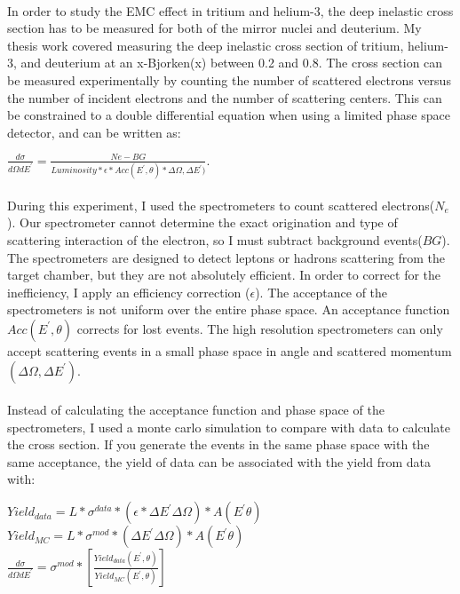 \documentclass[12pt,letterpaper]{article}
\begin{document}
\paragraph{} In order to study the EMC effect in tritium and helium-3, the deep inelastic cross section has to be measured for both of the mirror nuclei and deuterium. My thesis work covered measuring the deep inelastic cross section of tritium, helium-3, and deuterium at an x-Bjorken(x) between 0.2 and 0.8. The cross section can be measured experimentally by counting the number of scattered electrons versus the number of incident electrons and the number of scattering centers. This can be constrained to a double differential equation when using a limited phase space detector, and can be written as:
\begin{center}
$ \frac{d\sigma}{d\Omega dE^\prime} = \frac{Ne - BG }{Luminosity *  \epsilon * Acc(E^\prime ,\theta) * \Delta\Omega,\Delta E^\prime)} . $
 \end{center}
\paragraph{}During this experiment, I used the spectrometers to count scattered electrons($N_e$). Our spectrometer cannot determine the exact origination and type of scattering interaction of the electron, so I must subtract background events($BG$). The spectrometers are designed to detect leptons or hadrons scattering from the target chamber, but they are not absolutely efficient. In order to correct for the inefficiency, I apply an efficiency correction ($\epsilon$). The acceptance of the spectrometers is not uniform over the entire phase space. An acceptance function $Acc(E^\prime ,\theta)$ corrects for lost events. The high resolution spectrometers can only accept scattering events in a small phase space in angle and scattered momentum $ (\Delta\Omega,\Delta E^\prime)$. 
\paragraph{}Instead of calculating the acceptance function and phase space of the spectrometers, I used a monte carlo simulation to compare with data to calculate the cross section. If you generate the events in the same phase space with the same acceptance, the yield of data can be associated with the yield from data with:
\begin{center}
$ Yield_{data} = \textit{L} *\sigma^{data} * \left( \epsilon*\Delta E^\prime \Delta \Omega\right)*  A \left(E^\prime \theta \right)$\\
$ Yield_{MC} = \textit{L} *\sigma^{mod} * \left( \Delta E^\prime \Delta \Omega\right)*  A \left(E^\prime \theta \right)$\\

$ \frac{d\sigma}{d\Omega dE^\prime} = \sigma^{mod} * \left[\frac{Yield_{data} \left( 
	E^\prime,\theta\right)} {Yield_{MC}\left(E^\prime,\theta\right)}\right] $
\end{center}
\end{document}
